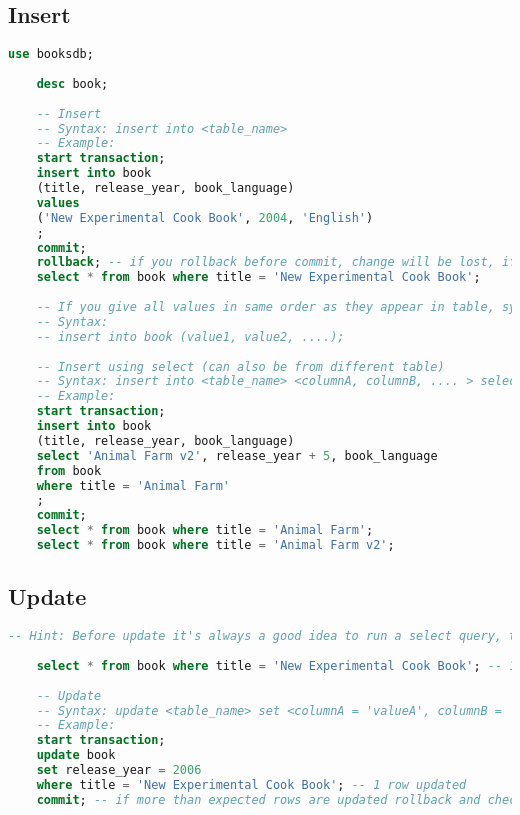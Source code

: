 \subsection{Insert}
\begin{lstlisting}[language=SQL]
	use booksdb;
	
	desc book;
	
	-- Insert
	-- Syntax: insert into <table_name>
	-- Example:
	start transaction;
	insert into book
	(title, release_year, book_language)
	values
	('New Experimental Cook Book', 2004, 'English')
	;
	commit;
	rollback; -- if you rollback before commit, change will be lost, if you rollback after commit, change is permanent already
	select * from book where title = 'New Experimental Cook Book';
	
	-- If you give all values in same order as they appear in table, syntax can change as below (skipping column names)
	-- Syntax:
	-- insert into book (value1, value2, ....);
	
	-- Insert using select (can also be from different table)
	-- Syntax: insert into <table_name> <columnA, columnB, .... > select <columnA, columnB> from <table_name> where <conditions>;
	-- Example:
	start transaction;
	insert into book
	(title, release_year, book_language)
	select 'Animal Farm v2', release_year + 5, book_language
	from book
	where title = 'Animal Farm'
	;
	commit;
	select * from book where title = 'Animal Farm';
	select * from book where title = 'Animal Farm v2';
\end{lstlisting}
\subsection{Update}
\begin{lstlisting}[language=SQL]
	-- Hint: Before update it's always a good idea to run a select query, to check what the where clause will return. If the were clause is not correct, undesired rows may be updated, if you do select first you can confirm it works as should. Same advice goes for delete.
	
	select * from book where title = 'New Experimental Cook Book'; -- 1 row
	
	-- Update
	-- Syntax: update <table_name> set <columnA = 'valueA', columnB = 'valueB', ....> where <conditions>;
	-- Example:
	start transaction;
	update book
	set release_year = 2006
	where title = 'New Experimental Cook Book'; -- 1 row updated
	commit; -- if more than expected rows are updated rollback and check
\end{lstlisting}
